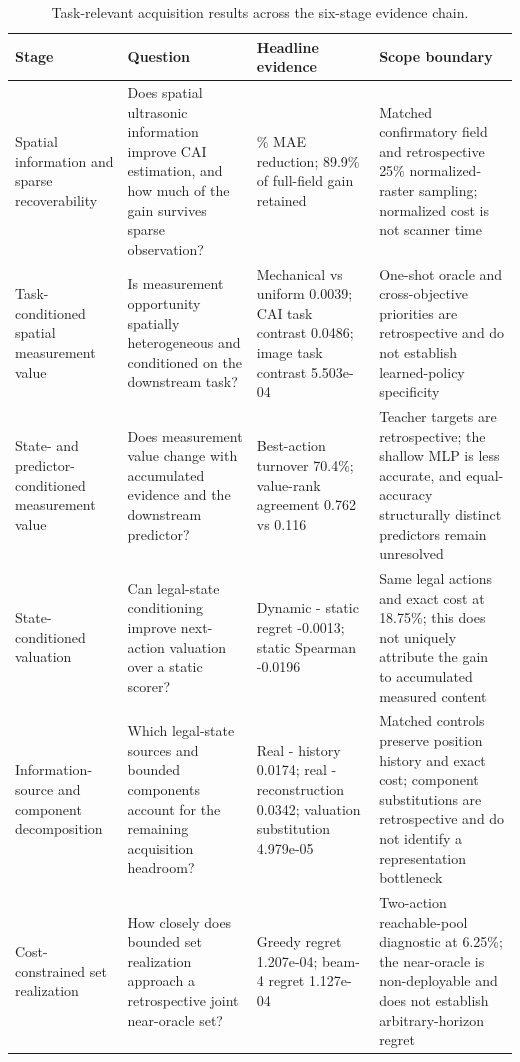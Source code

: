 \begin{table}[t]
\centering
\caption{Task-relevant acquisition results across the six-stage evidence chain.}
\label{tab:task-relevant-results}
\scriptsize
\setlength{\tabcolsep}{2.5pt}
\begin{tabularx}{\textwidth}{@{}>{\RaggedRight\arraybackslash}p{}>{\RaggedRight\arraybackslash}p{}>{\RaggedRight\arraybackslash}p{}X@{}}
\toprule
Stage & Question & Headline evidence & Scope boundary \\
\midrule
Spatial information and sparse recoverability & Does spatial ultrasonic information improve CAI estimation, and how much of the gain survives sparse observation? & 32.1\% MAE reduction; 89.9\% of full-field gain retained & Matched confirmatory field and retrospective 25\% normalized-raster sampling; normalized cost is not scanner time \\
Task-conditioned spatial measurement value & Is measurement opportunity spatially heterogeneous and conditioned on the downstream task? & Mechanical vs uniform 0.0039; CAI task contrast 0.0486; image task contrast 5.503e-04 & One-shot oracle and cross-objective priorities are retrospective and do not establish learned-policy specificity \\
State- and predictor-conditioned measurement value & Does measurement value change with accumulated evidence and the downstream predictor? & Best-action turnover 70.4\%; value-rank agreement 0.762 vs 0.116 & Teacher targets are retrospective; the shallow MLP is less accurate, and equal-accuracy structurally distinct predictors remain unresolved \\
State-conditioned valuation & Can legal-state conditioning improve next-action valuation over a static scorer? & Dynamic - static regret -0.0013; static Spearman -0.0196 & Same legal actions and exact cost at 18.75\%; this does not uniquely attribute the gain to accumulated measured content \\
Information-source and component decomposition & Which legal-state sources and bounded components account for the remaining acquisition headroom? & Real - history 0.0174; real - reconstruction 0.0342; valuation substitution 4.979e-05 & Matched controls preserve position history and exact cost; component substitutions are retrospective and do not identify a representation bottleneck \\
Cost-constrained set realization & How closely does bounded set realization approach a retrospective joint near-oracle set? & Greedy regret 1.207e-04; beam-4 regret 1.127e-04 & Two-action reachable-pool diagnostic at 6.25\%; the near-oracle is non-deployable and does not establish arbitrary-horizon regret \\
\bottomrule
\end{tabularx}
\end{table}
